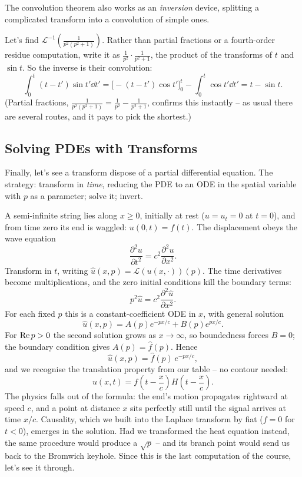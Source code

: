\documentclass[a4paper]{scrartcl}
\begin{document}
The convolution theorem also works as an \emph{inversion} device, splitting a complicated transform into a convolution of simple ones.

\begin{example}
	Let's find $\mathcal{L}^{-1}\left(\frac{1}{p^2(p^2+1)}\right)$. Rather than partial fractions or a fourth-order residue computation, write it as $\frac{1}{p^2} \cdot \frac{1}{p^2 + 1}$, the product of the transforms of $t$ and $\sin t$. So the inverse is their convolution:
	$$
	\int_0^t (t - t')\sin t' \dd t' = \Big[-(t - t')\cos t'\Big]_0^t - \int_0^t \cos t' \dd t' = t - \sin t.
	$$
	(Partial fractions, $\frac{1}{p^2(p^2+1)} = \frac{1}{p^2} - \frac{1}{p^2 + 1}$, confirms this instantly -- as usual there are several routes, and it pays to pick the shortest.)
\end{example}

\subsection{Solving PDEs with Transforms}

Finally, let's see a transform dispose of a partial differential equation. The strategy: transform in \emph{time}, reducing the PDE to an ODE in the spatial variable with $p$ as a parameter; solve it; invert.

\begin{example}
	A semi-infinite string lies along $x \geq 0$, initially at rest ($u = u_t = 0$ at $t = 0$), and from time zero its end is waggled: $u(0, t) = f(t)$. The displacement obeys the wave equation
	$$
	\frac{\partial^2 u}{\partial t^2} = c^2 \frac{\partial^2 u}{\partial x^2}.
	$$
	Transform in $t$, writing $\hat u(x, p) = \mathcal L(u(x, \cdot))(p)$. The time derivatives become multiplications, and the zero initial conditions kill the boundary terms:
	$$
	p^2 \hat u = c^2 \frac{\partial^2 \hat u}{\partial x^2}.
	$$
	For each fixed $p$ this is a constant-coefficient ODE in $x$, with general solution
	$$
	\hat u(x, p) = A(p) e^{-px/c} + B(p) e^{px/c}.
	$$
	For $\operatorname{Re} p > 0$ the second solution grows as $x \to \infty$, so boundedness forces $B = 0$; the boundary condition gives $A(p) = \hat f(p)$. Hence
	$$
	\hat u(x, p) = \hat f(p) \, e^{-px/c},
	$$
	and we recognise the translation property from our table -- no contour needed:
	$$
	u(x, t) = f\left(t - \frac xc\right) H\left(t - \frac xc\right).
	$$
	The physics falls out of the formula: the end's motion propagates rightward at speed $c$, and a point at distance $x$ sits perfectly still until the signal arrives at time $x/c$. Causality, which we built into the Laplace transform by fiat ($f = 0$ for $t < 0$), emerges in the solution. Had we transformed the heat equation instead, the same procedure would produce a $\sqrt p$ -- and its branch point would send us back to the Bromwich keyhole. Since this is the last computation of the course, let's see it through.
\end{example}
\end{document}
